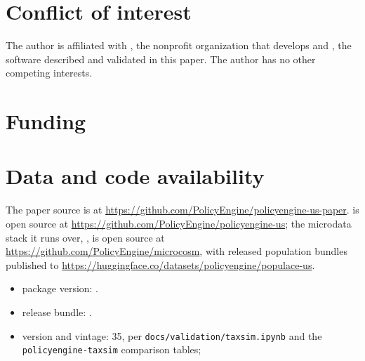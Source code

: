 \section*{Conflict of interest}
\label{sec:disclosures}

The author is affiliated with \policyengine{}, the nonprofit organization
that develops \policyengineus{} and \microcosm{}, the software described and
validated in this paper. The author has no other competing interests.

\section*{Funding}


\section*{Data and code availability}

The paper source is at
\url{https://github.com/PolicyEngine/policyengine-us-paper}.
\policyengineus{} is open source at
\url{https://github.com/PolicyEngine/policyengine-us}; the microdata stack
it runs over, \microcosm{}, is open source at
\url{https://github.com/PolicyEngine/microcosm}, with released population
bundles published to
\url{https://huggingface.co/datasets/policyengine/populace-us}.


\begin{itemize}
\item \policyengineus{} package version: .
\item \microcosm{} release bundle: .
\item \taxsim{} version and vintage: \taxsim{}35, per
\texttt{docs/validation/taxsim.ipynb} and the \texttt{policyengine-taxsim}
comparison tables; 
\end{itemize}
